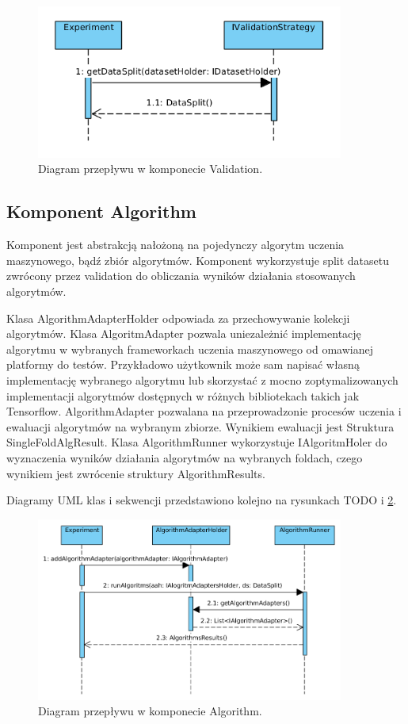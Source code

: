\documentclass[12pt]{article}
\begin{document}
\begin{figure}
	\centering
	\includegraphics[width=0.9\textwidth]{img/sequenceValidation.png}
	\caption{Diagram przepływu w komponecie Validation.}
	\label{fig:sequenceValidation}
\end{figure}

\subsection{Komponent Algorithm}

Komponent jest abstrakcją nałożoną na pojedynczy algorytm uczenia maszynowego, bądź zbiór algorytmów. Komponent wykorzystuje split datasetu zwrócony przez validation do obliczania wyników działania stosowanych algorytmów. 
 
Klasa AlgorithmAdapterHolder odpowiada za przechowywanie kolekcji algorytmów. Klasa AlgoritmAdapter pozwala uniezależnić implementację algorytmu w wybranych frameworkach uczenia maszynowego od omawianej platformy do testów. Przykładowo użytkownik może sam napisać własną implementację wybranego algorytmu lub skorzystać z mocno zoptymalizowanych implementacji algorytmów dostępnych w różnych bibliotekach takich jak Tensorflow. AlgorithmAdapter pozwalana na przeprowadzonie procesów uczenia i ewaluacji algorytmów na wybranym zbiorze. Wynikiem ewaluacji jest Struktura SingleFoldAlgResult. Klasa AlgorithmRunner wykorzystuje IAlgoritmHoler do wyznaczenia wyników działania algorytmów na wybranych foldach, czego wynikiem jest zwrócenie struktury AlgorithmResults.

Diagramy UML klas i sekwencji przedstawiono kolejno na rysunkach TODO i \ref{fig:sequenceAlgorithm}.

\begin{figure}
	\centering
	\includegraphics[width=0.9\textwidth]{img/sequenceAlgorithm.png}
	\caption{Diagram przepływu w komponecie Algorithm.}
	\label{fig:sequenceAlgorithm}
\end{figure}
\end{document}
